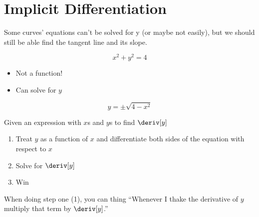 
\section{Implicit Differentiation}
Some curves' equations can't be solved for y (or maybe not easily), but we should still be able find the tangent line and its slope.
\begin{example}
    \begin{equation*}
        x^2 + y^2 = 4
    \end{equation*}
    \begin{itemize}
        \item Not a function!
        \item Can solve for $y$
    \end{itemize}
    \begin{equation*}
        y = \pm \sqrt{4 - x^2}
    \end{equation*}
    Given an expression with $x$s and $y$s to find $\deriv[y]$
    \begin{enumerate}
        \item Treat $y$ as a function of $x$ and differentiate both sides of the equation with respect to $x$
        \item Solve for $\deriv[y]$
        \item Win
    \end{enumerate}
\end{example}
\begin{note}
    When doing step one (1), you can thing ``Whenever I thake the derivative of $y$ multiply that term by $\deriv[y]$.''
\end{note}
